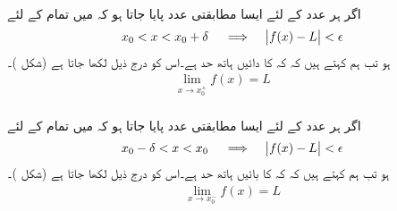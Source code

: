 \\
اگر ہر عدد  کے لئے ایسا مطابقتی عدد  پایا جاتا ہو کہ  میں  تمام  کے لئے
\begin{align}\label{مساوات_حد_دائیں_ہاتھ_حد}
x_0<x<x_0+\delta\quad \implies \quad \abs{f(x)-L}<\epsilon
\end{align}
ہو تب ہم کہتے ہیں کہ کہ  کا دائیں ہاتھ حد  ہے۔اس کو درج ذیل لکھا جاتا ہے  (شکل )۔
\begin{align*}
\lim_{x\to x_0^+} f(x)=L &&
\end{align*}
\\
اگر ہر عدد  کے لئے ایسا مطابقتی عدد  پایا جاتا ہو کہ  میں  تمام  کے لئے
\begin{align}\label{مساوات_حد_بائیں_ہاتھ_حد}
x_0-\delta<x<x_0\quad \implies \quad \abs{f(x)-L}<\epsilon
\end{align}
ہو تب ہم کہتے ہیں کہ کہ  کا بائیں ہاتھ حد  ہے۔اس کو درج ذیل لکھا جاتا ہے (شکل )۔
\begin{align*}
\lim_{x\to x_0^-} f(x)=L
\end{align*}
%
